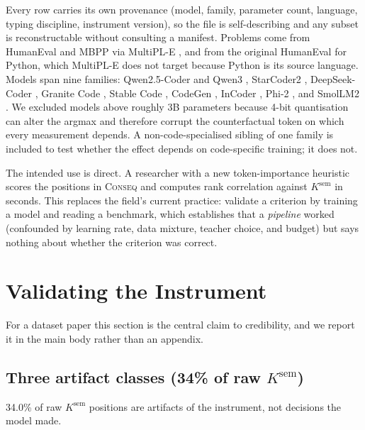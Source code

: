 \documentclass[twoside,11pt]{article}
\begin{document}
Every row carries its own provenance (model, family, parameter count, language, typing discipline,
instrument version), so the file is self-describing and any subset is reconstructable without
consulting a manifest. Problems come from HumanEval \citep{chen2021codex} and MBPP \citep{austin2021program} via
MultiPL-E \citep{cassano2023multipl}, and from the original HumanEval for Python, which MultiPL-E
does not target because Python is its source language. Models span nine families:
Qwen2.5-Coder and Qwen3 \citep{hui2024qwen25coder, yang2025qwen3}, StarCoder2
\citep{lozhkov2024starcoder2}, DeepSeek-Coder \citep{guo2024deepseekcoder}, Granite Code
\citep{mishra2024granite}, Stable Code \citep{pinnaparaju2024stablecode}, CodeGen
\citep{nijkamp2023codegen}, InCoder \citep{fried2023incoder}, Phi-2 \citep{javaheripi2023phi2},
and SmolLM2 \citep{allal2025smollm2}. We excluded models above roughly 3B parameters \citep{roziere2023codellama, zhu2024deepseekcoderv2, li2023starcoder}
because 4-bit quantisation can alter the argmax and therefore corrupt the counterfactual token on which every measurement
depends. A non-code-specialised sibling of one family is included to
test whether the effect depends on code-specific training; it does not.

The intended use is direct. A researcher with a new token-importance heuristic scores the positions
in \textsc{Conseq} and computes rank correlation against $K^{\mathrm{sem}}$ in seconds. This
replaces the field's current practice: validate a criterion by training a model and
reading a benchmark, which establishes that a \emph{pipeline} worked (confounded by learning
rate, data mixture, teacher choice, and budget) but says nothing about whether the criterion
was correct.

\section{Validating the Instrument}
\label{sec:validation}

For a dataset paper this section is the central claim to credibility, and we report it in the main
body rather than an appendix.

\subsection{Three artifact classes (34\% of raw $K^{\mathrm{sem}}$)}
\label{sec:artifacts}

34.0\% of raw $K^{\mathrm{sem}}$ positions are artifacts of the instrument, not
decisions the model made.
\end{document}
